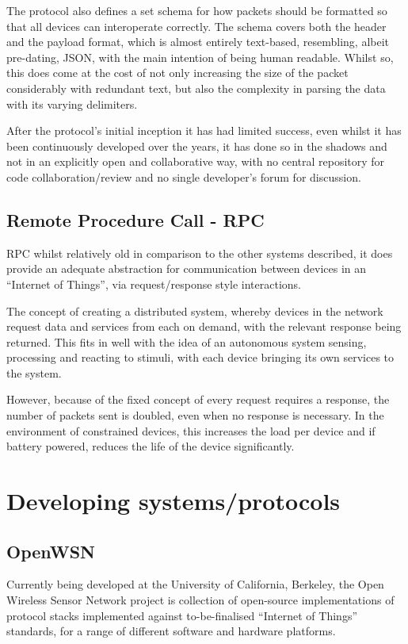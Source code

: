 The protocol also defines a set schema for how packets should be formatted so that all devices can interoperate correctly. The schema covers both the header and the payload format, which is almost entirely text-based, resembling, albeit pre-dating, JSON, with the main intention of being human readable. Whilst so, this does come at the cost of not only increasing the size of the packet considerably with redundant text, but also the complexity in parsing the data with its varying delimiters. 

After the protocol's initial inception it has had limited success, even whilst it has been continuously developed over the years, it has done so in the shadows and not in an explicitly open and collaborative way, with no central repository for code collaboration/review and no single developer's forum for discussion. %


\subsection{Remote Procedure Call - RPC} %
\label{sub:rpc}
RPC whilst relatively old in comparison to the other systems described, it does provide an adequate abstraction for communication between devices in an ``Internet of Things'', via request/response style interactions. 

The concept of creating a distributed system, whereby devices in the network request data and services from each on demand, with the relevant response being returned. This fits in well with the idea of an autonomous system sensing, processing and reacting to stimuli, with each device bringing its own services to the system.

However, because of the fixed concept of every request requires a response, the number of packets sent is doubled, even when no response is necessary. In the environment of constrained devices, this increases the load per device and if battery powered, reduces the life of the device significantly.

\section{Developing systems/protocols} %
\label{sec:developing_systems}

\subsection{OpenWSN} %
\label{sub:owsn_berkeley}
Currently being developed at the University of California, Berkeley, the Open Wireless Sensor Network project is collection of open-source implementations of protocol stacks implemented against to-be-finalised ``Internet of Things'' standards, for a range of different software and hardware platforms.

